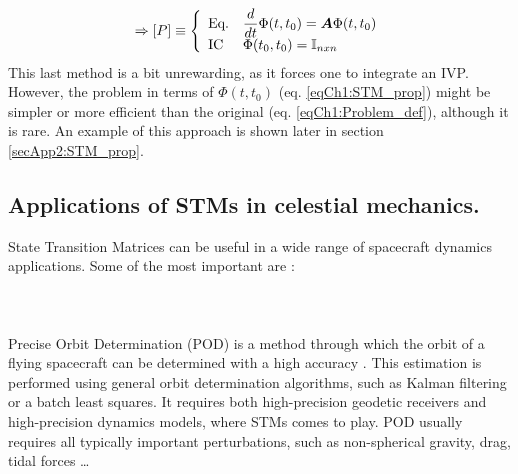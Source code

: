 \begin{itemize}
\[\begin{array}{ll}
	\end{array}
	\]
	\begin{equation}
	\Rightarrow [P] \equiv \left\{ \begin{array}{lll}
	\text{Eq.} 	& \dfrac{d}{dt} \Phi (t, t_0) = \mbox{\boldmath{${A}$}} \Phi(t, t_0)\\
	\text{IC} 	& \Phi(t_0, t_0) = \mathbb{I}_{nxn}
	\end{array}\right.
	\label{eqCh1:STM_prop}
	\end{equation}
	\indent This last method is a bit unrewarding, as it forces one to integrate an IVP. However, the problem in terms of $\Phi(t, t_0)$ (eq. \eqref{eqCh1:STM_prop}) might be simpler or more efficient than the original (eq. \eqref{eqCh1:Problem_def}), although it is rare. An example of this approach is shown later in section \ref{secApp2:STM_prop}.
	\end{itemize}
	\subsection{Applications of STMs in celestial mechanics.}
	\indent State Transition Matrices can be useful in a wide range of spacecraft dynamics applications. Some of the most important are \cite{STM_Apps}:
	\paragraph{ \\}
	\indent Precise Orbit Determination (POD) is a method through which the orbit of a flying spacecraft can be determined with a high accuracy \cite{POD}. This estimation is performed using general orbit determination algorithms, such as Kalman filtering or a batch least squares. It requires both high-precision geodetic receivers and high-precision dynamics models, where STMs comes to play. POD usually requires all typically important perturbations, such as non-spherical gravity, drag, tidal forces \ldots 
